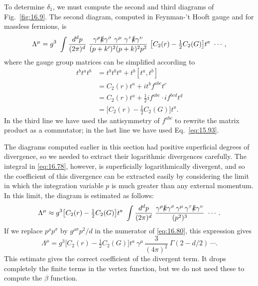 To determine $\delta_1$, we must compute the second and third diagrams of
Fig.~\ref{fig:16.9}.  The second diagram, computed in Feynman-'t Hooft gauge
and for massless fermions, is
\begin{equation}
  \Lambda^\mu = g^3\ \int \frac{d^dp}{(2\pi)^d}\ \frac{
    \gamma^\rho\slashed{k}\gamma^\sigma\ \gamma^\mu\ \gamma^\tau
    \slashed{k}\gamma^\upsilon }{(p+k')^2(p+k)^2p^2}\ \bigl[ C_2(r)
    - \tfrac{1}{2}C_2(G) \bigr]t^a\ \cdots ,
  \label{eq:16.78}
\end{equation}
where the gauge group matrices can be simplified according to
\begin{equation}
  \begin{aligned}
    t^bt^at^b &= t^bt^bt^a + t^b[t^a, t^b]\\
    &= C_2(r)t^a + it^bf^{abc}t^c\\
    &= C_2(r)t^a + \frac{1}{2}if^{abc}\cdot if^{bcd}t^d\\
    &= \bigl[ C_2(r) - \frac{1}{2}C_2(G) \bigr]t^a .
  \end{aligned}
  \label{eq:16.79}
\end{equation}
In the third line we have used the antisymmetry of $f^{abc}$ to rewrite the
matrix product as a commutator; in the last line we have used
Eq.~\eqref{eq:15.93}.

The diagrams computed earlier in this section had positive superficial
degrees of divergence, so we needed to extract their logarithmic divergences
carefully.  The integral in \eqref{eq:16.78}, however, is superficially
logarithmically divergent, and so the coefficient of this divergence can be
extracted easily by considering the limit in which the integration variable
$p$ is much greater than any external momentum.  In this limit, the diagram
is estimated as follows:
\begin{equation}
  \Lambda^\mu \approx g^3\bigl[ C_2(r) - \tfrac{1}{2}C_2(G) \bigr]t^a\ \int
    \frac{d^dp}{(2\pi)^d}\ \frac{\gamma^\rho\slashed{k}\gamma^\sigma\,
      \gamma^\mu\,\gamma^\tau\slashed{k}\gamma^\upsilon}{(p^2)^3}\ \cdots .
  \label{eq:16.80}
\end{equation}
If we replace $p^\rho p^\sigma$ by $g^{\rho\sigma}p^2/d$ in the numerator of
\eqref{eq:16.80}, this expression gives
\begin{equation}
  \Lambda^\mu = g^3\bigl[ C_2(r) - \tfrac{1}{2}C_2(G) \bigr]t^a\ \gamma^\mu\,
    \frac{3}{(4\pi)^2}\ \Gamma(2-d/2)\ \cdots .
  \label{eq:16.81}
\end{equation}
This estimate gives the correct coefficient of the divergent term.  It drops
completely the finite terms in the vertex function, but we do not need these
to compute the $\beta$ function.

